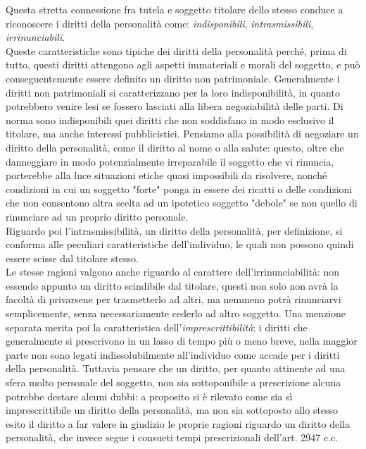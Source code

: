 Questa stretta connessione fra tutela e soggetto titolare dello stesso conduce a riconoscere i diritti della personalità come:
\textit{indisponibili}, \textit{intrasmissibili}, \textit{irrinunciabili}. 
\\Queste caratteristiche sono tipiche dei diritti della personalità perché, prima di tutto, questi diritti attengono agli aspetti immateriali e morali del soggetto, e può conseguentemente essere definito un diritto non patrimoniale. 
Generalmente i diritti non patrimoniali si caratterizzano per la loro indisponibilità, in quanto potrebbero venire lesi se fossero lasciati alla libera negoziabilità delle parti. Di norma sono indisponibili quei diritti che non soddisfano in modo esclusivo il titolare, ma anche interessi pubblicistici. 
Pensiamo alla possibilità di negoziare un diritto della personalità, come il diritto al nome o alla salute: questo, oltre che danneggiare in modo potenzialmente irreparabile il soggetto che vi rinuncia, porterebbe alla luce situazioni etiche quasi impossibili da risolvere, nonché condizioni in cui un soggetto "forte" ponga in essere dei ricatti o delle condizioni che non consentono altra scelta ad un ipotetico soggetto "debole" se non quello di rinunciare ad un proprio diritto personale.
\\Riguardo poi l'intrasmissibilità, un diritto della personalità, per definizione, si conforma alle peculiari caratteristiche dell'individuo, le quali non possono quindi essere scisse dal titolare stesso. 
\\Le stesse ragioni valgono anche riguardo al carattere dell'irrinunciabilità: non essendo appunto un diritto scindibile dal titolare, questi non solo non avrà la facoltà di privarsene per trasmetterlo ad altri, ma nemmeno potrà rinunciarvi semplicemente, senza necessariamente cederlo ad altro soggetto.
Una menzione separata merita poi la caratteristica dell'\textit{imprescrittibilità}: i diritti che generalmente si prescrivono in un lasso di tempo più o meno breve, nella maggior parte non sono legati indissolubilmente all'individuo come accade per i diritti della personalità. Tuttavia pensare che un diritto, per quanto attinente ad una sfera  molto personale del soggetto, non sia sottoponibile a prescrizione alcuna potrebbe destare alcuni dubbi: a proposito si è rilevato come sia sì imprescrittibile un diritto della personalità, ma non sia sottoposto allo stesso esito il diritto a far valere in giudizio le proprie ragioni riguardo un diritto della personalità, che invece segue i consueti tempi prescrizionali dell'art. 2947 c.c.



